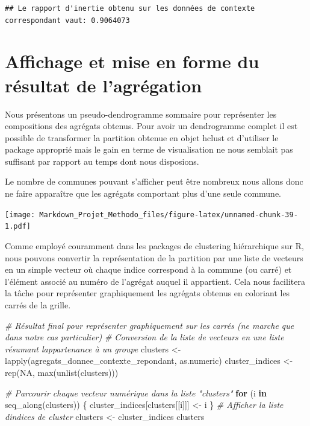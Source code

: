 \documentclass[
]{article}
\newenvironment{Shaded}{\begin{snugshade}}{\end{snugshade}}
\newcommand{\CommentTok}[1]{\textcolor[rgb]{0.56,0.35,0.01}{\textit{#1}}}
\newcommand{\ConstantTok}[1]{\textcolor[rgb]{0.00,0.00,0.00}{#1}}
\newcommand{\ControlFlowTok}[1]{\textcolor[rgb]{0.13,0.29,0.53}{\textbf{#1}}}
\newcommand{\FunctionTok}[1]{\textcolor[rgb]{0.00,0.00,0.00}{#1}}
\newcommand{\NormalTok}[1]{#1}
\newcommand{\OtherTok}[1]{\textcolor[rgb]{0.56,0.35,0.01}{#1}}
\begin{document}
\begin{verbatim}
## Le rapport d'inertie obtenu sur les données de contexte correspondant vaut: 0.9064073
\end{verbatim}

\hypertarget{affichage-et-mise-en-forme-du-ruxe9sultat-de-lagruxe9gation}{%
\section{Affichage et mise en forme du résultat de
l'agrégation}\label{affichage-et-mise-en-forme-du-ruxe9sultat-de-lagruxe9gation}}

Nous présentons un pseudo-dendrogramme sommaire pour représenter les
compositions des agrégats obtenus. Pour avoir un dendrogramme complet il
est possible de transformer la partition obtenue en objet hclust et
d'utiliser le package approprié mais le gain en terme de visualisation
ne nous semblait pas suffisant par rapport au temps dont nous
disposions.

Le nombre de communes pouvant s'afficher peut être nombreux nous allons
donc ne faire apparaître que les agrégats comportant plus d'une seule
commune.

\texttt{[image: Markdown\_Projet\_Methodo\_files/figure-latex/unnamed-chunk-39-1.pdf]}

Comme employé couramment dans les packages de clustering hiérarchique
sur R, nous pouvons convertir la représentation de la partition par une
liste de vecteurs en un simple vecteur où chaque indice correspond à la
commune (ou carré) et l'élément associé au numéro de l'agrégat auquel il
appartient. Cela nous facilitera la tâche pour représenter graphiquement
les agrégats obtenus en coloriant les carrés de la grille.

\begin{Shaded}
\begin{Highlighting}[]
\CommentTok{\# Résultat final pour représenter graphiquement sur les carrés (ne marche que dans notre cas particulier)}
\CommentTok{\# Conversion de la liste de vecteurs en une liste résumant l\textquotesingle{}appartenance à un groupe}
\NormalTok{clusters }\OtherTok{\textless{}{-}} \FunctionTok{lapply}\NormalTok{(agregats\_donnee\_contexte\_repondant, as.numeric)}
\NormalTok{cluster\_indices }\OtherTok{\textless{}{-}} \FunctionTok{rep}\NormalTok{(}\ConstantTok{NA}\NormalTok{, }\FunctionTok{max}\NormalTok{(}\FunctionTok{unlist}\NormalTok{(clusters)))}

\CommentTok{\# Parcourir chaque vecteur numérique dans la liste "clusters"}
\ControlFlowTok{for}\NormalTok{ (i }\ControlFlowTok{in} \FunctionTok{seq\_along}\NormalTok{(clusters)) \{}
\NormalTok{  cluster\_indices[clusters[[i]]] }\OtherTok{\textless{}{-}}\NormalTok{ i}
\NormalTok{\}}
\CommentTok{\# Afficher la liste d\textquotesingle{}indices de cluster}
\NormalTok{clusters }\OtherTok{\textless{}{-}}\NormalTok{ cluster\_indices }
\NormalTok{clusters}
\end{Highlighting}
\end{Shaded}
\end{document}
